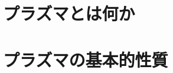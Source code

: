 \documentclass{report}
\begin{document}
  \maketitle
  \tableofcontents
  \chapter{プラズマとは何か}
    
  \chapter{プラズマの基本的性質}
    
\end{document}
